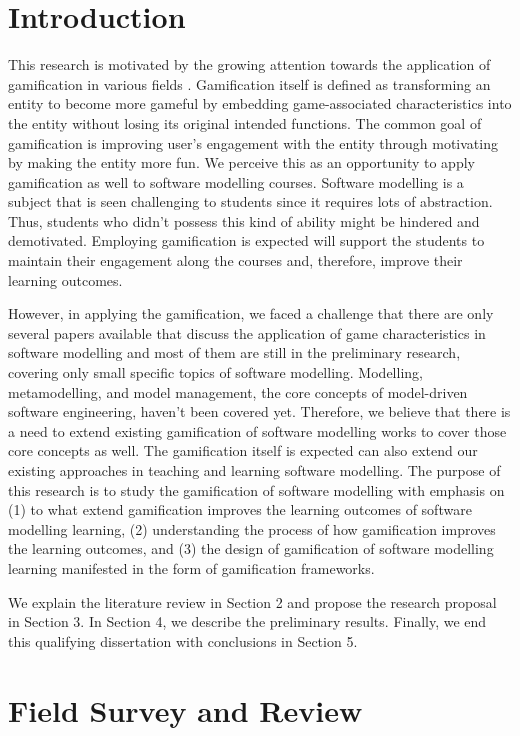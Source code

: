 \documentclass[a4paper]{Report}
\begin{document}
\chapter{Introduction}
This research is motivated by the growing attention towards the application of gamification in various fields \cite{kolovos2015eugenia}. Gamification itself is defined as transforming an entity to become more gameful by embedding game-associated characteristics into the entity without losing its original intended functions. The common goal of gamification is improving user’s engagement with the entity through motivating by making the entity more fun. We perceive this as an opportunity to apply gamification as well to software modelling courses. Software modelling is a subject that is seen challenging to students since it requires lots of abstraction. Thus, students who didn’t possess this kind of ability might be hindered and demotivated. Employing gamification is expected will support the students to maintain their engagement along the courses and, therefore, improve their learning outcomes. 

However, in applying the gamification, we faced a challenge that there are only several papers available that discuss the application of game characteristics in software modelling and most of them are still in the preliminary research, covering only small specific topics of software modelling. Modelling, metamodelling, and model management, the core concepts of model-driven software engineering, haven’t been covered yet.  Therefore, we believe that there is a need to extend existing gamification of software modelling works to cover those core concepts as well. The gamification itself is expected can also extend our existing approaches in teaching and learning software modelling. The purpose of this research is to study the gamification of software modelling with emphasis on (1) to what extend gamification improves the learning outcomes of software modelling learning, (2) understanding the process of how gamification improves the learning outcomes, and (3) the design of gamification of software modelling learning manifested in the form of gamification frameworks.

We explain the literature review in Section 2 and propose the research proposal in Section 3. In Section 4, we describe the preliminary results. Finally, we end this qualifying dissertation with conclusions in Section 5.


\chapter{Field Survey and Review}
\end{document}
